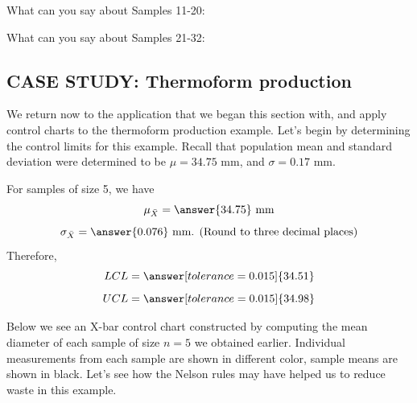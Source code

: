 \documentclass{ximera}
\begin{document}
\begin{problem}
What can you say about Samples  11-20:
\begin{multipleChoice}
\end{multipleChoice}

What can you say about Samples  21-32:
\begin{multipleChoice}
\end{multipleChoice}
\end{problem}

\subsection*{CASE STUDY: Thermoform production}

We return now to the application that we began this section with, and apply control charts to the thermoform production example.
Let's begin by determining the control limits for this example.  Recall that population mean and standard deviation were determined to be $\mu=34.75$ mm, and $\sigma=0.17$ mm.  

\begin{question}\label{quest:contLimTh}
For samples of size 5, we have 
$$\mu_{\bar{X}}=\answer{34.75}\mbox{ mm}$$
$$\sigma_{\bar{X}}=\answer{0.076}\mbox{ mm. (Round to three decimal places)}$$
Therefore,
$$LCL=\answer[tolerance=0.015]{34.51}$$
$$UCL=\answer[tolerance=0.015]{34.98}$$
\end{question}

Below we see an X-bar control chart constructed by computing the mean diameter of each sample of size $n=5$ we obtained earlier.  Individual measurements from each sample are shown in different color, sample means are shown in black. Let's see how the Nelson rules may have helped us to reduce waste in this example.
\end{document}
